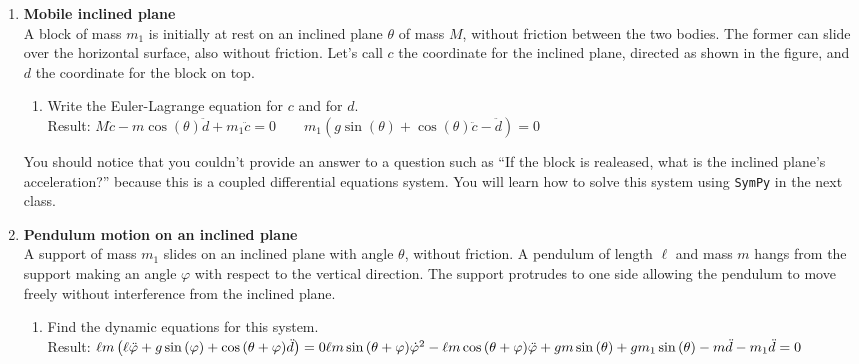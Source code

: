 \documentclass[11pt, a4paper, twoside]{article}
\begin{document}
\begin{enumerate}
\item
	\begin{minipage}[t][4.5cm]{0.7\textwidth}
		\textbf{Mobile inclined plane}\\
		A block of mass \(m_1\) is initially at rest on an inclined plane \(\theta\) of mass \(M\), without friction between the two bodies.
		The former can slide over the horizontal surface, also without friction.
		Let's call \(c\) the coordinate for the inclined plane, directed as shown in the figure, and \(d\) the coordinate for the block on top.
		\begin{enumerate}
			\item Write the Euler-Lagrange equation for \(c\) and for \(d\).\\ 
			Result:
	\(
		M \ddot{c} - m \cos{\left(\theta \right)} \ddot{d} + m_1 \ddot{c} = 0
		\qquad
		m_1 \left(g \sin{\left(\theta \right)} + \cos{\left(\theta \right)} \ddot{c} - \ddot{d }\right) = 0
	\)
		\end{enumerate}
	\end{minipage}
	\begin{minipage}[c][0cm][t]{0.3\textwidth}
		
	\end{minipage}
	You should notice that you couldn't provide an answer to a question such as ``If the block is realeased, what is the inclined plane's acceleration?'' because this is a coupled differential equations system.
	You will learn how to solve this system using \verb'SymPy' in the next class.


\item
	\begin{minipage}[t][4.5cm]{0.7\textwidth}
		\textbf{Pendulum motion on an inclined plane}\\
		A support of mass \(m_1\) slides on an inclined plane with angle \(\theta\), without friction.
		A pendulum of length \(\ell\) and mass \(m\) hangs from the support making an angle \(\varphi\) with respect to the vertical direction.
		The support protrudes to one side allowing the pendulum to move freely without interference from the inclined plane.
		\begin{enumerate}
			\item Find the dynamic equations for this system.\\
			Result:
			\(
				\ell m \left(\ell \ddot{\varphi} + g \sin{\left(\varphi \right)} + \cos{\left(\theta + \varphi \right)} \ddot{d}\right) = 0 \\
				\ell m \sin{\left(\theta + \varphi \right)} \dot{\varphi}^{2} - \ell m \cos{\left(\theta + \varphi \right)} \ddot{\varphi} + g m \sin{\left(\theta \right)} + g m_{1} \sin{\left(\theta \right)} - m \ddot{d} - m_{1} \ddot{d} = 0
			\)
		\end{enumerate}
	\end{minipage}
	\begin{minipage}[c][0cm][t]{0.3\textwidth}
		
	\end{minipage}
	



\end{enumerate}
\end{document}
